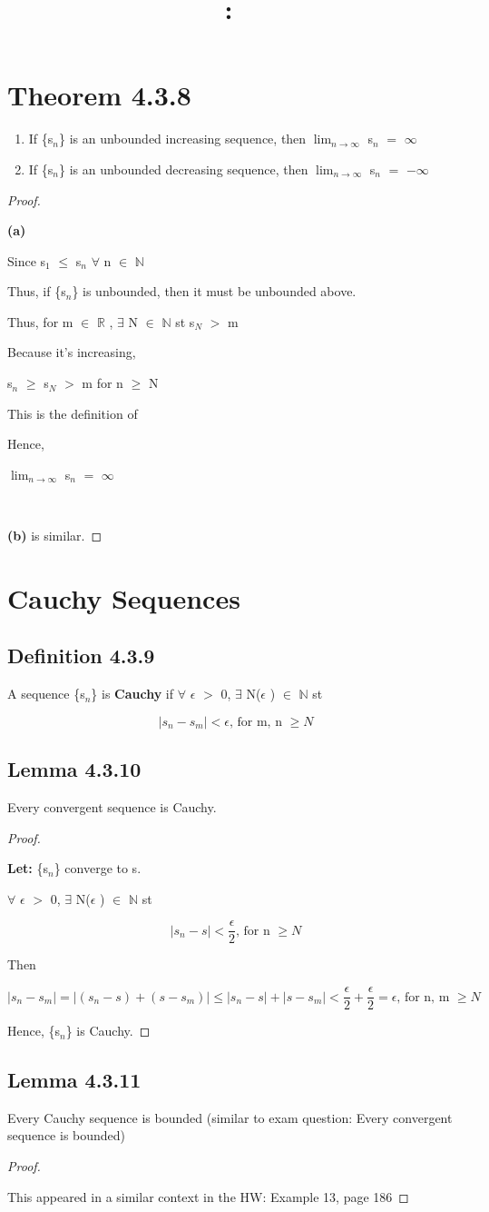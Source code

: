 \documentclass{article}
\title{
    \vspace{2in}
    \textmd{\textbf{\hmwkClass:\ \hmwkTitle}}\\
    \normalsize\vspace{0.1in}\small\vspace{0.1in}\large{\textit{\hmwkClassInstructor}}
    \vspace{3in}
}
\author{\hmwkAuthorName}
\date{}
\newcommand{\mt}[1]{\ensuremath{#1}}
\newcommand\bsc[2][\DefaultOpt]{%
  \def\DefaultOpt{#2}%
  \section[#1]{#2}%
}
\newcommand\ssc[2][\DefaultOpt]{%
  \def\DefaultOpt{#2}%
  \subsection[#1]{#2}%
}
\newcommand{\bgpf}{\begin{proof} $ $\newline}
\newcommand{\balist}{\begin{enumerate}[label=\alph*.]}
\newcommand{\elist}{\end{enumerate}}
\newcommand{\lt}[1]{\textbf{Let: } #1}
\newcommand{\bpth}[1]{\textbf{(#1)}}
\newcommand{\epf}{\end{proof}}
\newcommand{\br}{\mt{\mathbb{R}} }       %
\newcommand{\bn}{\mt{\mathbb{N}} }       %
\newcommand{\ep}{\mt{\epsilon} }         %
\newcommand{\fa}{\mt{\forall} }          %
\newcommand{\mem}{\mt{\in} }
\newcommand{\exs}{\mt{\exists} }
\newcommand{\bk}[1]{\{#1\}}
\newcommand{\gr}{\mt{>} }
\newcommand{\lse}{\mt{\leq} }
\newcommand{\gre}{\mt{\geq} }
\newcommand{\eql}{\mt{=} }
\newcommand{\uw}[2]{#1\mt{_{#2}}}
\newcommand{\lmti}[1]{\mt{\displaystyle{\lim_{#1 \to \infty}}}}
\newcommand{\eqn}[1]{\[#1\]}
\begin{document}
\bsc{Theorem 4.3.8}{

\balist
\item If \bk{\uw{s}{n}} is an unbounded increasing sequence, then \lmti{n} \uw{s}{n} \eql $\infty$
\item If \bk{\uw{s}{n}} is an unbounded decreasing sequence, then \lmti{n} \uw{s}{n} \eql $-\infty$
\elist

\bgpf

\bpth{a}

Since \uw{s}{1} \lse \uw{s}{n} \fa n \mem \bn 

Thus, if \bk{\uw{s}{n}} is unbounded, then it must be unbounded above.

Thus, for m \mem \br, \exs N \mem \bn st \uw{s}{N} \gr m

Because it's increasing,

\uw{s}{n} \gre \uw{s}{N} \gr m for n \gre N

This is the definition of

Hence,

\lmti{n} \uw{s}{n} \eql $\infty$ \

\

\bpth{b} is similar.

\epf

}

\bsc{Cauchy Sequences}{

\ssc{Definition 4.3.9}{

A sequence \bk{\uw{s}{n}} is \textbf{Cauchy} if \fa \ep \gr 0, \exs N(\ep) \mem \bn st

\eqn{|s_n - s_m| < \ep\textrm{, for m, n }\gre N}

}

\ssc{Lemma 4.3.10}{

Every convergent sequence is Cauchy.

\bgpf

\lt{\bk{\uw{s}{n}} converge to s.}

\fa \ep \gr 0, \exs N(\ep) \mem \bn st 

\eqn{|s_n - s| < \frac{\epsilon}{2}\textrm{, for n }\gre N}

Then

\eqn{|s_n - s_m| = |(s_n - s) + (s - s_m)| \lse |s_n - s| + |s - s_m| < \frac{\epsilon}{2} + \frac{\epsilon}{2} = \ep\textrm{, for n, m }\gre N}

Hence, \bk{\uw{s}{n}} is Cauchy.
\epf

}

\ssc{Lemma 4.3.11}{

Every Cauchy sequence is bounded (similar to exam question: Every convergent sequence is bounded)

\bgpf

This appeared in a similar context in the HW: Example 13, page 186

\epf

}

}
\end{document}

